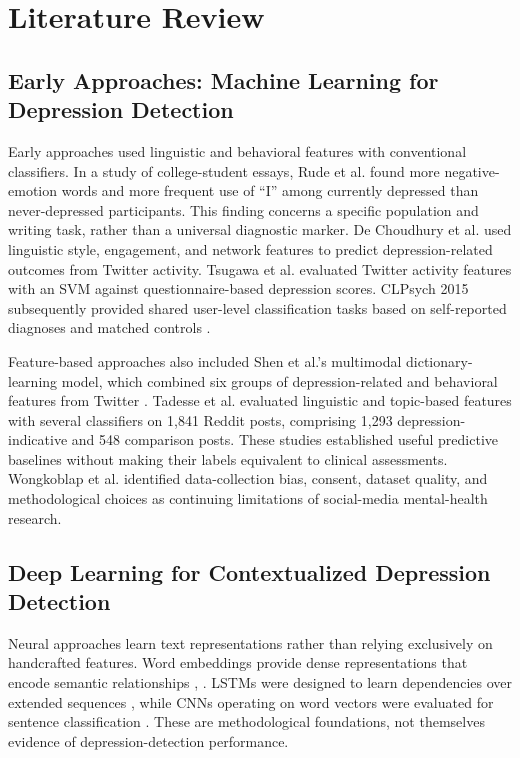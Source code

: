 \documentclass{ieeeaccess}
\begin{document}
\section{Literature Review}

\subsection{Early Approaches: Machine Learning for Depression Detection}

Early approaches used linguistic and behavioral features with conventional classifiers. In a study of college-student essays, Rude et al. \cite{ref20} found more negative-emotion words and more frequent use of ``I'' among currently depressed than never-depressed participants. This finding concerns a specific population and writing task, rather than a universal diagnostic marker. De Choudhury et al. \cite{ref21} used linguistic style, engagement, and network features to predict depression-related outcomes from Twitter activity. Tsugawa et al. \cite{ref22} evaluated Twitter activity features with an SVM against questionnaire-based depression scores. CLPsych 2015 subsequently provided shared user-level classification tasks based on self-reported diagnoses and matched controls \cite{ref23}.

Feature-based approaches also included Shen et al.'s multimodal dictionary-learning model, which combined six groups of depression-related and behavioral features from Twitter \cite{ref29}. Tadesse et al. \cite{ref31} evaluated linguistic and topic-based features with several classifiers on 1,841 Reddit posts, comprising 1,293 depression-indicative and 548 comparison posts. These studies established useful predictive baselines without making their labels equivalent to clinical assessments. Wongkoblap et al. \cite{ref24} identified data-collection bias, consent, dataset quality, and methodological choices as continuing limitations of social-media mental-health research.

\subsection{Deep Learning for Contextualized Depression Detection}

Neural approaches learn text representations rather than relying exclusively on handcrafted features. Word embeddings provide dense representations that encode semantic relationships \cite{ref25}, \cite{ref26}. LSTMs were designed to learn dependencies over extended sequences \cite{ref27}, while CNNs operating on word vectors were evaluated for sentence classification \cite{ref28}. These are methodological foundations, not themselves evidence of depression-detection performance.
\end{document}
